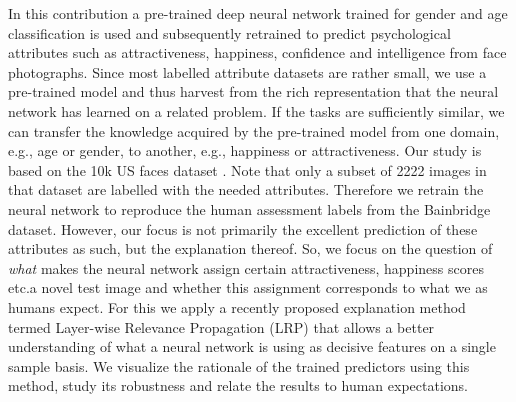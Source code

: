 \documentclass[runningheads]{llncs}
\begin{document}
In this contribution a pre-trained deep neural network trained for gender and age classification \cite{levi2015age} is used and subsequently retrained to predict psychological attributes such as attractiveness, happiness, confidence and intelligence from face photographs. Since most labelled attribute datasets are rather small, we use a pre-trained model and thus harvest from the rich representation that the neural network has learned on a related problem. If the tasks are sufficiently similar, we can transfer the knowledge acquired by the pre-trained model from one domain, e.g., age or gender, to another, e.g., happiness or attractiveness.
Our study is based on the 10k US faces dataset \cite{bainbridge2013intrinsic}. Note that only a subset of 2222 images in that dataset are labelled with the needed attributes. Therefore we retrain the neural network \cite{levi2015age} to reproduce the human assessment labels from the Bainbridge dataset. 
However, our focus is not primarily the excellent prediction of these attributes as such, but the explanation thereof. So, we focus on the question of {\it what} makes the neural network assign certain attractiveness, happiness scores etc.\to a novel test image and whether this assignment corresponds to what we as humans expect.
For this we apply a recently proposed explanation method termed Layer-wise Relevance Propagation (LRP) \cite{bach2015pixel} that allows a better understanding of what a neural network is using as decisive features on a single sample basis. We visualize the rationale of the trained predictors using this method, study its robustness and relate the results to human expectations. 
\end{document}
